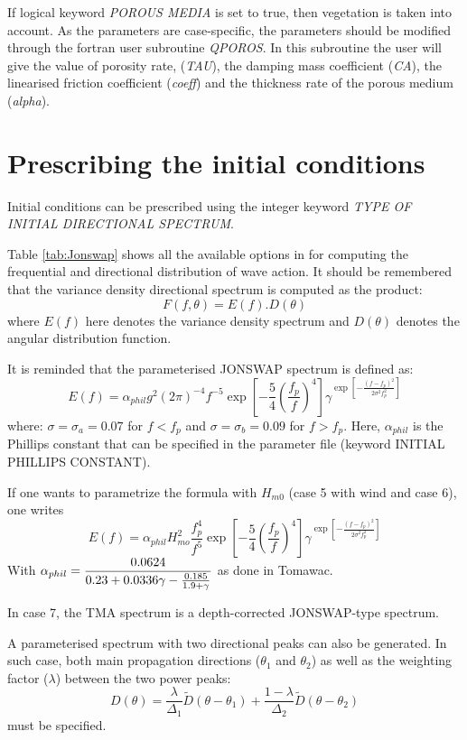 If logical keyword \textit{POROUS MEDIA} is set to true, then vegetation is taken into account. As the parameters are case-specific, the parameters should be modified through the fortran user subroutine \textit{QPOROS}. In this subroutine the user will give the value of porosity rate, (\textit{TAU}), the damping mass coefficient (\textit{CA}),  the linearised friction coefficient (\textit{coeff}) and the thickness rate of the porous medium (\textit{alpha}).

 \section{ Prescribing the initial conditions}
\label{se:initcond}
 Initial conditions can be prescribed using the integer keyword \textit{TYPE OF INITIAL DIRECTIONAL SPECTRUM}.

Table \ref{tab:Jonswap} shows all the available options in \tomawac for computing the frequential and directional distribution of wave action. It should be remembered that the variance density directional spectrum is computed as the product:
\[F(f,\theta )=E(f).D(\theta )\]
where $E(f)$ here denotes the variance density spectrum and $D\left(\theta \right)$ denotes the angular distribution function.

 It is reminded that the parameterised JONSWAP spectrum is defined as:
\[E(f)=\alpha _{phil} g^{2} (2\pi )^{-4} f^{-5} \exp \left[-\frac{5}{4} \left(\frac{f_{p}^{} }{f^{} } \right)^{4} \right]\gamma ^{\exp \left[-\frac{\left(f-f_{p} \right)^{2} }{2\sigma ^{2} f_{p}^{2} } \right]} \]
where:  $\sigma =\sigma_{a} =0.07$ for  $f< f_{p}$  and  $\sigma =\sigma_{b} =0.09$ for  $f> f_{p}$. Here, $\alpha_{phil}$  is the Phillips constant that can be specified in the parameter file (keyword INITIAL PHILLIPS CONSTANT).

 If one wants to parametrize the formula with $H_{m0}$ (case 5 with wind and case 6), one writes
\[E(f)=\alpha _{phil} H_{mo}^{2} \frac{f_{p}^{4} }{f^{5} } \exp \left[-\frac{5}{4} \left(\frac{f_{p}^{} }{f^{} } \right)^{4} \right]\gamma ^{\exp \left[-\frac{\left(f-f_{p} \right)^{2} }{2\sigma ^{2} f_{p}^{2} } \right]} \]
With $\displaystyle \alpha _{phil} =\frac{0.0624}{0.23+0.0336\gamma -\frac{0.185}{1.9+\gamma } } $ as done in Tomawac.

 In case 7, the TMA spectrum is a depth-corrected JONSWAP-type spectrum.

 A parameterised spectrum with two directional peaks can also be generated. In such case, both main propagation directions ($\theta _{1} $ and $\theta _{2} $) as well as the weighting factor ($\lambda $) between the two power peaks:
\[D(\theta )=\frac{\lambda }{\Delta _{1} } \tilde{D}(\theta -\theta _{1} )+\frac{1-\lambda }{\Delta _{2} } \tilde{D}(\theta -\theta _{2} )\]
must be specified.

